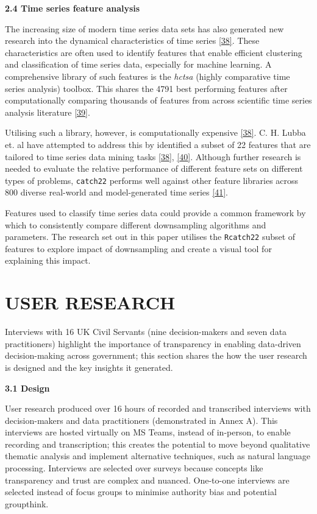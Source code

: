 \documentclass{article}
\begin{document}
\textbf{2.4 Time series feature analysis}

The increasing size of modern time series data sets has also generated
new research into the dynamical characteristics of time series
\protect\hyperlink{ref-catch22}{{[}38{]}}. These characteristics are
often used to identify features that enable efficient clustering and
classification of time series data, especially for machine learning. A
comprehensive library of such features is the \emph{hctsa} (highly
comparative time series analysis) toolbox. This shares the 4791 best
performing features after computationally comparing thousands of
features from across scientific time series analysis literature
\protect\hyperlink{ref-fulcher2017}{{[}39{]}}.

Utilising such a library, however, is computationally expensive
\protect\hyperlink{ref-catch22}{{[}38{]}}. C. H. Lubba et. al have
attempted to address this by identified a subset of 22 features that are
tailored to time series data mining tasks
\protect\hyperlink{ref-catch22}{{[}38{]}},
\protect\hyperlink{ref-bagnall}{{[}40{]}}. Although further research is
needed to evaluate the relative performance of different feature sets on
different types of problems, \texttt{catch22} performs well against
other feature libraries across 800 diverse real-world and
model-generated time series \protect\hyperlink{ref-henderson}{{[}41{]}}.

Features used to classify time series data could provide a common
framework by which to consistently compare different downsampling
algorithms and parameters. The research set out in this paper utilises
the \texttt{Rcatch22} subset of features to explore impact of
downsampling and create a visual tool for explaining this impact.

\hypertarget{user-research}{%
\section{USER RESEARCH}\label{user-research}}

Interviews with 16 UK Civil Servants (nine decision-makers and seven
data practitioners) highlight the importance of transparency in enabling
data-driven decision-making across government; this section shares the
how the user research is designed and the key insights it generated.

\textbf{3.1 Design}

User research produced over 16 hours of recorded and transcribed
interviews with decision-makers and data practitioners (demonstrated in
Annex A). This interviews are hosted virtually on MS Teams, instead of
in-person, to enable recording and transcription; this creates the
potential to move beyond qualitative thematic analysis and implement
alternative techniques, such as natural language processing. Interviews
are selected over surveys because concepts like transparency and trust
are complex and nuanced. One-to-one interviews are selected instead of
focus groups to minimise authority bias and potential groupthink.
\end{document}
